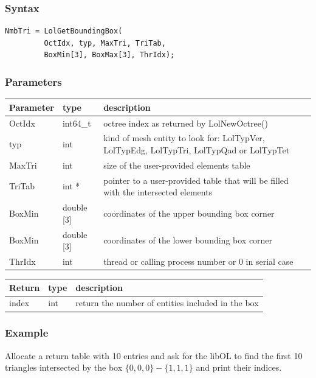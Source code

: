\documentclass[a4paper,12pt]{article}
\begin{document}
\subsubsection*{Syntax}
\begin{tt}
\begin{verbatim}
NmbTri = LolGetBoundingBox(
         OctIdx, typ, MaxTri, TriTab,
         BoxMin[3], BoxMax[3], ThrIdx);
\end{verbatim}
\end{tt}
\normalfont

\subsubsection*{Parameters}
\begin{tabular}{|m{3cm}|m{2cm}|m{8.5cm}|}
\hline
Parameter  & type      & description \\
\hline
OctIdx     & int64\_t  & octree index as returned by LolNewOctree() \\
\hline
typ        & int       & kind of mesh entity to look for: LolTypVer, LolTypEdg, LolTypTri, LolTypQad or LolTypTet \\
\hline
MaxTri     & int       & size of the user-provided elements table \\
\hline
TriTab     & int *     & pointer to a user-provided table that will be filled with the intersected elements \\
\hline
BoxMin     & double [3] & coordinates of the upper bounding box corner \\
\hline
BoxMin     & double [3] & coordinates of the lower bounding box corner \\
\hline
ThrIdx     & int        & thread or calling process number or 0 in serial case \\
\hline
\end{tabular}

\medskip

\begin{tabular}{|m{3cm}|m{2cm}|m{8.5cm}|}
\hline
Return     & type   & description \\
\hline
index      & int    & return the number of entities included in the box \\
\hline
\end{tabular}

\subsubsection*{Example}
Allocate a return table with 10 entries and ask for the libOL to find the first 10 triangles intersected by the box $\{0,0,0\} - \{1,1,1\}$ and print their indices.
\end{document}
